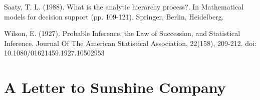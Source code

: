 \documentclass{mcmthesis}
\begin{document}
\begin{thebibliography}{99}%
    Saaty, T. L. (1988). What is the analytic hierarchy process?. In Mathematical models for decision support (pp. 109-121). Springer, Berlin, Heidelberg.
    
     Wilson, E. (1927). Probable Inference, the Law of Succession, and Statistical Inference. Journal Of The American Statistical Association, 22(158), 209-212. doi: 10.1080/01621459.1927.10502953
    
    
\end{thebibliography}
    
\newpage

\section{A Letter to Sunshine Company }
\end{document}
